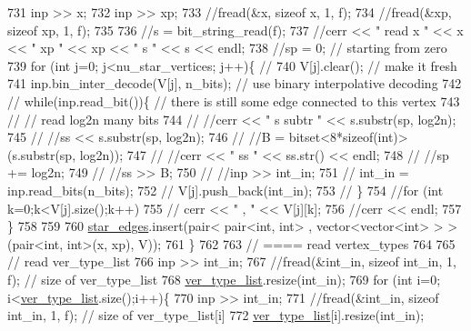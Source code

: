 \begin{DoxyCode}
731     inp >> x;
732     inp >> xp;
733     \textcolor{comment}{//fread(&x, sizeof x, 1, f);}
734     \textcolor{comment}{//fread(&xp, sizeof xp, 1, f);}
735   
736     \textcolor{comment}{//s = bit\_string\_read(f);}
737     \textcolor{comment}{//cerr << " read  x " << x << " xp " << xp << " s " << s << endl;}
738     \textcolor{comment}{//sp = 0; // starting from zero }
739     \textcolor{keywordflow}{for} (\textcolor{keywordtype}{int} j=0; j<nu\_star\_vertices; j++)\{ \textcolor{comment}{// }
740       V[j].clear(); \textcolor{comment}{// make it fresh}
741       inp.bin\_inter\_decode(V[j], n\_bits); \textcolor{comment}{// use binary interpolative decoding }
742       \textcolor{comment}{// while(inp.read\_bit())\{ // there is still some edge connected to this vertex }
743       \textcolor{comment}{//   // read log2n many bits}
744       \textcolor{comment}{//   //cerr << " s subtr " << s.substr(sp, log2n);}
745       \textcolor{comment}{//   //ss << s.substr(sp, log2n);}
746       \textcolor{comment}{//   //B = bitset<8*sizeof(int)>(s.substr(sp, log2n));}
747       \textcolor{comment}{//   //cerr << " ss " << ss.str() << endl;}
748       \textcolor{comment}{//   //sp += log2n;}
749       \textcolor{comment}{//   //ss >> B;}
750       \textcolor{comment}{//   //inp >> int\_in;}
751       \textcolor{comment}{//   int\_in = inp.read\_bits(n\_bits);}
752       \textcolor{comment}{//   V[j].push\_back(int\_in);}
753       \textcolor{comment}{// \}}
754       \textcolor{comment}{//for (int k=0;k<V[j].size();k++)}
755       \textcolor{comment}{//  cerr << " , " << V[j][k];}
756       \textcolor{comment}{//cerr << endl;}
757     \}
758 
759 
760     \hyperlink{classmarked__graph__compressed_a7df5779d313486644132bd816937f532}{star\_edges}.insert(pair< pair<int, int> , vector<vector<int> > > (pair<int, int>(x, xp), V));
761   \}
762 
763   \textcolor{comment}{// ==== read vertex\_types}
764 
765   \textcolor{comment}{// read ver\_type\_list}
766   inp >> int\_in;
767   \textcolor{comment}{//fread(&int\_in, sizeof int\_in, 1, f); // size of ver\_type\_list}
768   \hyperlink{classmarked__graph__compressed_af2e3e55223d436628a02758dfae88493}{ver\_type\_list}.resize(int\_in);
769   \textcolor{keywordflow}{for} (\textcolor{keywordtype}{int} i=0; i<\hyperlink{classmarked__graph__compressed_af2e3e55223d436628a02758dfae88493}{ver\_type\_list}.size();i++)\{
770     inp >> int\_in;
771     \textcolor{comment}{//fread(&int\_in, sizeof int\_in, 1, f); // size of ver\_type\_list[i]}
772     \hyperlink{classmarked__graph__compressed_af2e3e55223d436628a02758dfae88493}{ver\_type\_list}[i].resize(int\_in);

\end{DoxyCode}
